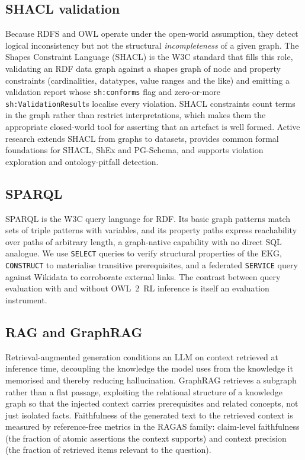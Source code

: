 \documentclass[sageh]{sagej}
\begin{document}
\subsection{SHACL validation}
Because RDFS and OWL operate under the open-world assumption, they detect logical inconsistency but not the structural \emph{incompleteness} of a given graph. The Shapes Constraint Language (SHACL) is the W3C standard that fills this role, validating an RDF data graph against a shapes graph of node and property constraints (cardinalities, datatypes, value ranges and the like) and emitting a validation report whose \texttt{sh:conforms} flag and zero-or-more \texttt{sh:ValidationResult}s localise every violation.\cite{w3c-shacl} SHACL constraints count terms in the graph rather than restrict interpretations, which makes them the appropriate closed-world tool for asserting that an artefact is well formed. Active research extends SHACL from graphs to datasets,\cite{dao2025shaclds} provides common formal foundations for SHACL, ShEx and PG-Schema,\cite{ahmetaj2025foundations} and supports violation exploration and ontology-pitfall detection.\cite{steinparz2026shaclens,choi2025vspo,maillot2025eatyourown}

\subsection{SPARQL}
SPARQL is the W3C query language for RDF. Its basic graph patterns match sets of triple patterns with variables, and its property paths express reachability over paths of arbitrary length, a graph-native capability with no direct SQL analogue.\cite{w3c-sparql11,ducharme2013sparql} We use \texttt{SELECT} queries to verify structural properties of the EKG, \texttt{CONSTRUCT} to materialise transitive prerequisites, and a federated \texttt{SERVICE} query against Wikidata to corroborate external links. The contrast between query evaluation with and without OWL~2~RL inference is itself an evaluation instrument.

\subsection{RAG and GraphRAG}
Retrieval-augmented generation conditions an LLM on context retrieved at inference time, decoupling the knowledge the model uses from the knowledge it memorised and thereby reducing hallucination.\cite{lewis2020rag} GraphRAG retrieves a subgraph rather than a flat passage, exploiting the relational structure of a knowledge graph so that the injected context carries prerequisites and related concepts, not just isolated facts.\cite{edge2024graphrag,peng2024graphrag} Faithfulness of the generated text to the retrieved context is measured by reference-free metrics in the RAGAS family: claim-level faithfulness (the fraction of atomic assertions the context supports) and context precision (the fraction of retrieved items relevant to the question).\cite{es2023ragas}
\end{document}
